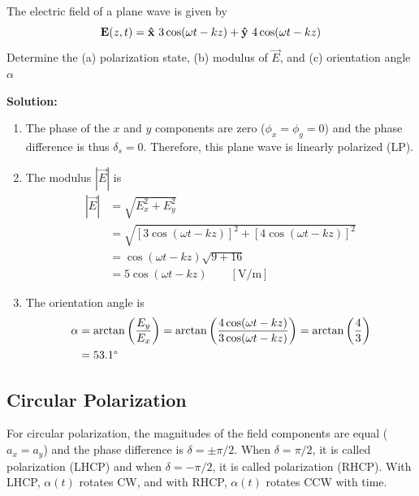 \begin{example}
    The electric field of a plane wave is given by 
    $$ \boldsymbol{\mathrm{E}}(z,t) = \boldsymbol{{\mathrm{\hat{x}}}}\ 3\cos(\omega t - kz) + \boldsymbol{{\mathrm{\hat{y}}}}\ 4\cos(\omega t - kz) $$
    Determine the (a) polarization state, (b) modulus of $\vec{E}$, and (c) orientation angle $\alpha$

    \vspace{0.25cm}
    \textbf{Solution:} 
    \begin{enumerate}[label=(\alph*)]
        \item The phase of the $x$ and $y$ components are zero ($\phi_x = \phi_y = 0$) and the phase difference is thus $\delta_s = 0$. Therefore, this plane wave is linearly polarized (LP).  

        \item The modulus $|\vec{E}|$ is 
        \begin{align*}
            |\vec{E}| &= \sqrt{E_x^2 + E_y^2} \\ 
            &= \sqrt{[3\cos(\omega t - kz)]^2 + [4\cos(\omega t - kz)]^2} \\ 
            &= \cos(\omega t - kz) \sqrt{9 + 16} \\ 
            &= 5 \cos(\omega t - kz) \qquad [\text{V/m}]
        \end{align*}

        \item The orientation angle is 
        \begin{align*}
            \alpha &= \arctan\left(\dfrac{E_y}{E_x}\right) = \arctan\left(\dfrac{4\cos(\omega t - kz)}{3\cos(\omega t - kz)} \right) = \arctan\left(\dfrac{4}{3} \right) \\ 
            &= 53.1\degree
        \end{align*}
    \end{enumerate}
\end{example}

\subsection{Circular Polarization}
For circular polarization, the magnitudes of the field components are equal ($a_x = a_y$) and the phase difference is $\delta = \pm\pi/2$. When $\delta=\pi/2$, it is called  polarization (LHCP) and when $\delta = -\pi/2$, it is called  polarization (RHCP). With LHCP, $\alpha(t)$ rotates CW, and with RHCP, $\alpha(t)$ rotates CCW with time. \par 

